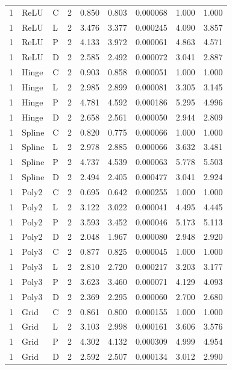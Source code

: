 \begin{longtable}{lllrrrrrr}
1 & ReLU & C & 2 & 0.850 & 0.803 & 0.000068 & 1.000 & 1.000 \\
1 & ReLU & L & 2 & 3.476 & 3.377 & 0.000245 & 4.090 & 3.857 \\
1 & ReLU & P & 2 & 4.133 & 3.972 & 0.000061 & 4.863 & 4.571 \\
1 & ReLU & D & 2 & 2.585 & 2.492 & 0.000072 & 3.041 & 2.887 \\
1 & Hinge & C & 2 & 0.903 & 0.858 & 0.000051 & 1.000 & 1.000 \\
1 & Hinge & L & 2 & 2.985 & 2.899 & 0.000081 & 3.305 & 3.145 \\
1 & Hinge & P & 2 & 4.781 & 4.592 & 0.000186 & 5.295 & 4.996 \\
1 & Hinge & D & 2 & 2.658 & 2.561 & 0.000050 & 2.944 & 2.809 \\
1 & Spline & C & 2 & 0.820 & 0.775 & 0.000066 & 1.000 & 1.000 \\
1 & Spline & L & 2 & 2.978 & 2.885 & 0.000066 & 3.632 & 3.481 \\
1 & Spline & P & 2 & 4.737 & 4.539 & 0.000063 & 5.778 & 5.503 \\
1 & Spline & D & 2 & 2.494 & 2.405 & 0.000477 & 3.041 & 2.924 \\
1 & Poly2 & C & 2 & 0.695 & 0.642 & 0.000255 & 1.000 & 1.000 \\
1 & Poly2 & L & 2 & 3.122 & 3.022 & 0.000041 & 4.495 & 4.445 \\
1 & Poly2 & P & 2 & 3.593 & 3.452 & 0.000046 & 5.173 & 5.113 \\
1 & Poly2 & D & 2 & 2.048 & 1.967 & 0.000080 & 2.948 & 2.920 \\
1 & Poly3 & C & 2 & 0.877 & 0.825 & 0.000045 & 1.000 & 1.000 \\
1 & Poly3 & L & 2 & 2.810 & 2.720 & 0.000217 & 3.203 & 3.177 \\
1 & Poly3 & P & 2 & 3.623 & 3.460 & 0.000071 & 4.129 & 4.093 \\
1 & Poly3 & D & 2 & 2.369 & 2.295 & 0.000060 & 2.700 & 2.680 \\
1 & Grid & C & 2 & 0.861 & 0.800 & 0.000155 & 1.000 & 1.000 \\
1 & Grid & L & 2 & 3.103 & 2.998 & 0.000161 & 3.606 & 3.576 \\
1 & Grid & P & 2 & 4.302 & 4.132 & 0.000309 & 4.999 & 4.954 \\
1 & Grid & D & 2 & 2.592 & 2.507 & 0.000134 & 3.012 & 2.990 \\
\end{longtable}
\endgroup


